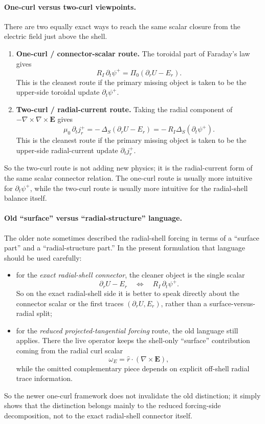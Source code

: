 \documentclass[11pt,a4paper]{article}
\begin{document}
\paragraph{One-curl versus two-curl viewpoints.}
There are two equally exact ways to reach the same scalar closure from the
electric field just above the shell.
\begin{enumerate}
\item \textbf{One-curl / connector-scalar route.} The toroidal part of
Faraday's law gives
\[
R_I\,\partial_t\psi^+
=
\Pi_0(\partial_r U - E_r).
\]
This is the cleanest route if the primary missing object is taken to be the
upper-side toroidal update \(\partial_t\psi^+\).

\item \textbf{Two-curl / radial-current route.} Taking the radial component of
\(-\nabla\times\nabla\times \mathbf E\) gives
\[
\mu_0\,\partial_t j_r^+
=
-\,\Delta_S(\partial_r U - E_r)
=
-\,R_I\Delta_S(\partial_t\psi^+).
\]
This is the cleanest route if the primary missing object is taken to be the
upper-side radial-current update \(\partial_t j_r^+\).
\end{enumerate}
So the two-curl route is not adding new physics; it is the radial-current form
of the same scalar connector relation. The one-curl route is usually more
intuitive for \(\partial_t\psi^+\), while the two-curl route is usually more
intuitive for the radial-shell balance itself.

\paragraph{Old ``surface'' versus ``radial-structure'' language.}
The older note sometimes described the radial-shell forcing in terms of a
``surface part'' and a ``radial-structure part.'' In the present formulation
that language should be used carefully:
\begin{itemize}
\item for the \emph{exact radial-shell connector}, the cleaner object is the
single scalar
\[
\partial_r U - E_r
\quad\Longleftrightarrow\quad
R_I\,\partial_t\psi^+.
\]
So on the exact radial-shell side it is better to speak directly about the
connector scalar or the first traces \((\partial_r U, E_r)\), rather than a
surface-versus-radial split;

\item for the \emph{reduced projected-tangential forcing} route, the old
language still applies. There the live operator keeps the shell-only
``surface'' contribution coming from the radial curl scalar
\[
\omega_E = \hat r\cdot(\nabla\times \mathbf E),
\]
while the omitted complementary piece depends on explicit off-shell radial
trace information.
\end{itemize}
So the newer one-curl framework does not invalidate the old distinction; it
simply shows that the distinction belongs mainly to the reduced forcing-side
decomposition, not to the exact radial-shell connector itself.
\end{document}
